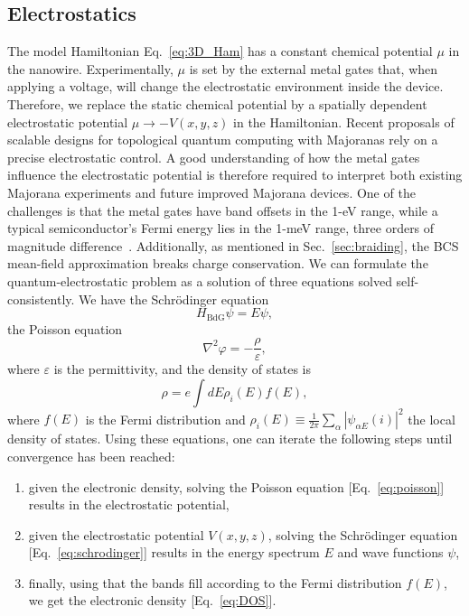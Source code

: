 \subsection{Electrostatics}
The model Hamiltonian Eq.~\eqref{eq:3D_Ham} has a constant chemical potential $\mu$ in the nanowire.
Experimentally, $\mu$ is set by the external metal gates that, when applying a voltage, will change the electrostatic environment inside the device.
Therefore, we replace the static chemical potential by a spatially dependent electrostatic potential $\mu \rightarrow -V(x, y, z)$ in the Hamiltonian.
Recent proposals of scalable designs for topological quantum computing with Majoranas rely on a precise electrostatic control.
A good understanding of how the metal gates influence the electrostatic potential is therefore required to interpret both existing Majorana experiments and future improved Majorana devices.
One of the challenges is that the metal gates have band offsets in the 1-eV range, while a typical semiconductor's Fermi energy lies in the 1-meV range, three orders of magnitude difference~\cite{Armagnat2019}.
Additionally, as mentioned in Sec.~\ref{sec:braiding}, the BCS mean-field approximation breaks charge conservation.
We can formulate the quantum-electrostatic problem as a solution of three equations solved self-consistently.
We have the Schrödinger equation
\begin{equation}
H_\textrm{BdG} \psi = E \psi,\label{eq:schrodinger}
\end{equation}
the Poisson equation
\begin{equation}
\nabla^2 \varphi = -\frac{\rho }{\varepsilon},\label{eq:poisson}
\end{equation}
where $\varepsilon$ is the permittivity, and the density of states is
\begin{equation}
\rho = e \int dE \rho_i(E) f(E),\label{eq:DOS}
\end{equation}
where $f(E)$ is the Fermi distribution and $\rho_i(E) \equiv \frac{1}{2\pi} \sum_\alpha {\left| \psi_{\alpha E}(i) \right|}^2$ the local density of states.
Using these equations, one can iterate the following steps until convergence has been reached:
\begin{enumerate}
\item given the electronic density, solving the Poisson equation [Eq.~\eqref{eq:poisson}] results in the electrostatic potential,
\item given the electrostatic potential $V(x, y, z)$, solving the Schrödinger equation [Eq.~\eqref{eq:schrodinger}] results in the energy spectrum $E$ and wave functions $\psi$,
\item finally, using that the bands fill according to the Fermi distribution $f(E)$, we get the electronic density [Eq.~\eqref{eq:DOS}].
\end{enumerate}
